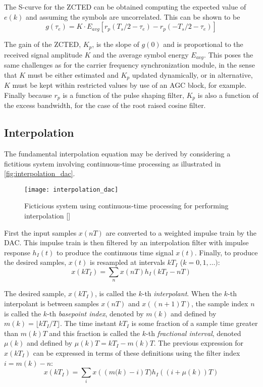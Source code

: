 The S-curve for the ZCTED can be obtained computing the expected value of $e(k)$ and assuming the symbols are uncorrelated. This can be shown to be
\begin{equation}
g(\tau_e)=K\cdot E_{avg}\left[ r_p\left(T_s/2-\tau_e\right) - r_p\left(-T_s/2-\tau_e\right) \right]
\end{equation}

The gain of the ZCTED, $K_p$, is the slope of $g(0)$ and is proportional to the received signal amplitude $K$ and the average symbol energy $E_{avg}$. This poses the same challenges as for the carrier frequency synchronization module, in the sense that $K$ must be either estimated and $K_p$ updated dynamically, or in alternative, $K$ must be kept within restricted values by use of an AGC block, for example. Finally because $r_p$ is a function of the pulse shaping filter, $K_p$ is also a function of the excess bandwidth, for the case of the root raised cosine filter.

\subsection{Interpolation}

The fundamental interpolation equation may be derived by considering a fictitious system involving continuous-time processing as illustrated in \autoref{fig:interpolation_dac}.

\begin{figure}[H]
  \centering
  \texttt{[image: interpolation\_dac]}
  \caption{Ficticious system using continuous-time processing for performing interpolation [\citeauthor{digcomm_discrete_approach}]}
  \label{fig:interpolation_dac}
\end{figure}

First the input samples $x(nT)$ are converted to a weighted impulse train by the DAC. This impulse train is then filtered by an interpolation filter with impulse response $h_I(t)$ to produce the continuous time signal $x(t)$. Finally, to produce the desired samples, $x(t)$ is resampled at intervals $kT_I$ ($k=0,1,\ldots)$:
\begin{equation}
x(kT_I)=\sum_{n} x(nT)h_I(kT_I-nT)
\end{equation}

The desired sample, $x(kT_I)$, is called the $k$-th \emph{interpolant}. When the $k$-th interpolant is between samples $x(nT)$ and $x((n+1)T)$, the sample index $n$ is called the $k$-th \emph{basepoint index}, denoted by $m(k)$ and defined by $m(k)=\lfloor kT_I/T \rfloor$. The time instant $kT_I$ is some fraction of a sample time greater than $m(k)T$ and this fraction is called the $k$-th \emph{fractional interval}, denoted $\mu(k)$ and defined by $\mu(k)T=kT_I-m(k)T$. The previous expression for $x(kT_I)$ can be expressed in terms of these definitions using the filter index $i=m(k)-n$:
\begin{equation}
x(kT_I)=\sum_{i} x\left(\left(m(k\right)-i\right)T)h_I\left(\left(i+\mu\left(k\right)\right)T\right)
\end{equation}

